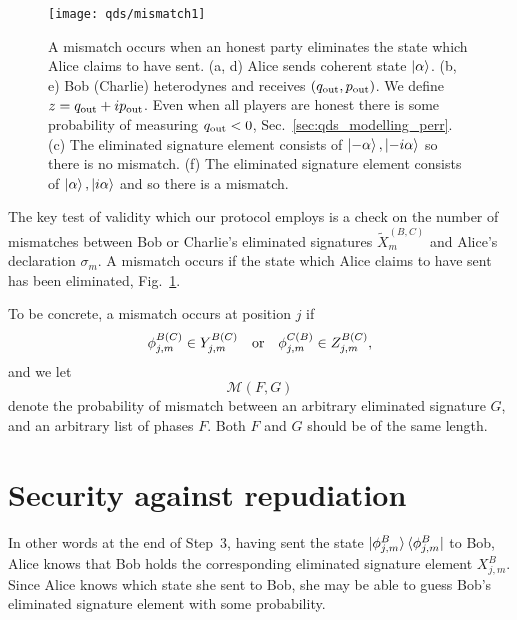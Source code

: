 \begin{figure}[htp]
\captionsetup{width=0.8\linewidth}
\centering
\texttt{[image: qds/mismatch1]}
\caption{\label{fig:qds_mismatches} A mismatch occurs when an honest party eliminates the state which Alice claims to have sent. (a, d) Alice sends coherent state $\ket{\alpha}$. (b, e) Bob (Charlie) heterodynes and receives $\left(q_{\text{out}}, p_{\text{out}}\right)$. We define $z = q_{\text{out}} + i p_{\text{out}}$. Even when all players are honest there is some probability of measuring $q_{\text{out}} < 0$, Sec.~\ref{sec:qds_modelling_perr}. (c) The eliminated signature element consists of $\ket{- \alpha}, \ket{- i \alpha}$ so there is no mismatch. (f) The eliminated signature element consists of $\ket{\alpha}, \ket{i \alpha}$ and so there is a mismatch.}
\end{figure}


The key test of validity which our protocol employs is a check on the number of mismatches between Bob or Charlie's eliminated signatures $\tilde{X}^{\left(B, C\right)}_m$ and Alice's declaration $\sigma_m$. A mismatch occurs if the state which Alice claims to have sent has been eliminated, Fig.~\ref{fig:qds_mismatches}. 

To be concrete, a mismatch occurs at position $j$ if
\begin{equation}
\phi_{j, m}^{B \left(C\right)} \in Y_{j, m}^{B \left(C\right)} \qq{or} \phi_{j, m}^{C \left(B\right)} \in Z_{j, m}^{B \left(C\right)}, 
\end{equation}
and we let
\begin{equation}
\mathcal{M}\left(F, G\right)
\end{equation}
denote the probability of mismatch between an arbitrary eliminated signature $G$, and an arbitrary list of phases $F$. Both $F$ and $G$ should be of the same length.




\section{Security against repudiation}\label{sec:qds_security_repudiation}
\iffalse
In other words at the end of Step~$3$, having sent the state $\ket{\phi_{j, m}^B}\bra{\phi_{j, m}^B}$ to Bob, Alice knows that Bob holds the corresponding eliminated signature element $X_{j, m}^B$. Since Alice knows which state she sent to Bob, she may be able to guess Bob's eliminated signature element with some probability. 

